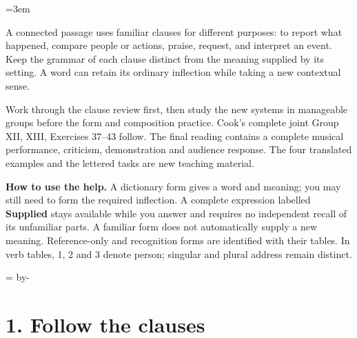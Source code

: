 \newcommand{\runningtitle}{Unit 17. Exposition and praise}

\emergencystretch=3em
\newcommand{\itempara}[2]{\par\addvspace{3pt}\noindent\hangindent=1.8em\hangafter=1\makebox[1.8em][l]{#1.}#2\par}
\newcommand{\reserve}[1]{\par\penalty-100\begingroup\dimen0=\pagegoal\advance\dimen0 by-\pagetotal\ifdim\dimen0<#1\newpage\fi\endgroup}

\raggedright
{}

A connected passage uses familiar clauses for different purposes: to report what happened, compare people or actions, praise, request, and interpret an event. Keep the grammar of each clause distinct from the meaning supplied by its setting. A word can retain its ordinary inflection while taking a new contextual sense.

Work through the clause review first, then study the new systems in manageable groups before the form and composition practice. Cook’s complete joint Group XII, XIII, Exercises 37–43 follow. The final reading contains a complete musical performance, criticism, demonstration and audience response. The four translated examples and the lettered tasks are new teaching material.

\textbf{How to use the help.} A dictionary form gives a word and meaning; you may still need to form the required inflection. A complete expression labelled \textbf{Supplied} stays available while you answer and requires no independent recall of its unfamiliar parts. A familiar form does not automatically supply a new meaning. Reference-only and recognition forms are identified with their tables. In verb tables, 1, 2 and 3 denote person; singular and plural address remain distinct.

\reserve{7\baselineskip}
\section*{1. Follow the clauses}

